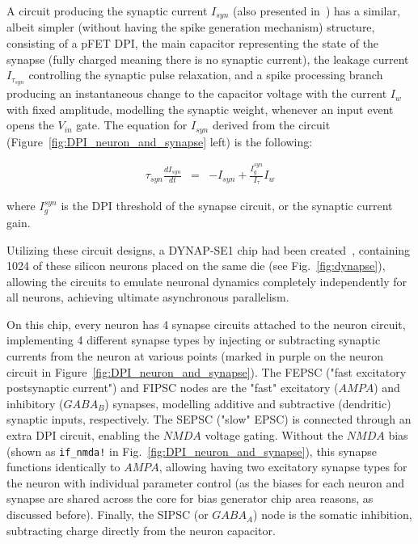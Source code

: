 A circuit producing the synaptic current $I_{syn}$ (also presented in~\cite{Chicca_etal14}) has a similar, albeit simpler (without having the spike generation mechanism) structure, consisting of a pFET DPI, the main capacitor representing the state of the synapse (fully charged meaning there is no synaptic current), the leakage current $I_{\tau_{syn}}$ controlling the synaptic pulse relaxation, and a spike processing branch producing an instantaneous change to the capacitor voltage with the current $I_w$ with fixed amplitude, modelling the synaptic weight, whenever an input event opens the $V_{in}$ gate. The equation for $I_{syn}$ derived from the circuit (Figure~\ref{fig:DPI_neuron_and_synapse} left) is the following:

\begin{eqnarray}
    \tau_{syn}\frac{dI_{syn}}{dt}&=&-I_{syn}+\frac{I^{syn}_{g}}{I_\tau} I_w
    \label{eq:DPI_synapse}
\end{eqnarray}

where $I^{syn}_{g}$ is the \ac{DPI} threshold of the synapse circuit, or the synaptic current gain.

Utilizing these circuit designs, a \ac{DYNAP}-SE1 chip had been created~\cite{Moradi_etal18}, containing 1024 of these silicon neurons placed on the same die (see Fig.~\ref{fig:dynapse}), allowing the circuits to emulate neuronal dynamics completely independently for all neurons, achieving ultimate asynchronous parallelism. 

On this chip, every neuron has 4 synapse circuits attached to the neuron circuit, implementing 4 different synapse types by injecting or subtracting synaptic currents from the neuron at various points (marked in purple on the neuron circuit in Figure~\ref{fig:DPI_neuron_and_synapse}). The FEPSC ("fast excitatory postsynaptic current") and FIPSC nodes are the "fast" excitatory ($AMPA$) and inhibitory ($GABA_B$) synapses, modelling additive and subtractive (dendritic) synaptic inputs, respectively. The SEPSC ("slow" EPSC) is connected through an extra \ac{DPI} circuit, enabling the $NMDA$ voltage gating. Without the $NMDA$ bias (shown as \verb|if_nmda!| in Fig.~\ref{fig:DPI_neuron_and_synapse}), this synapse functions identically to $AMPA$, allowing having two excitatory synapse types for the neuron with individual parameter control (as the biases for each neuron and synapse are shared across the core for bias generator chip area reasons, as discussed before). Finally, the SIPSC (or $GABA_A$) node is the somatic inhibition, subtracting charge directly from the neuron capacitor.

